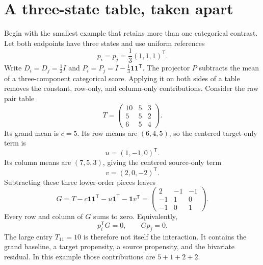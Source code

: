 \section*{A three-state table, taken apart}

Begin with the smallest example that retains more than one categorical contrast.  Let both
endpoints have three states and use uniform references
\begin{equation}
p_i=p_j=\frac13(1,1,1)^{\mathsf T}.
\end{equation}
Write $D_i=D_j=\frac13I$ and
$P_i=P_j=I-\frac13\mathbf1\mathbf1^{\mathsf T}$.  The projector $P$ subtracts the mean of a
three-component categorical score.  Applying it on both sides of a table removes the constant,
row-only, and column-only contributions.
Consider the raw pair table
\begin{equation}
T=
\begin{pmatrix}
10&5&3\\
5&5&2\\
6&5&4
\end{pmatrix}.
\label{eq:book-three-state-raw}
\end{equation}
Its grand mean is $c=5$.  Its row means are $(6,4,5)$, so the centered target-only term is
\begin{equation}
u=(1,-1,0)^{\mathsf T}.
\end{equation}
Its column means are $(7,5,3)$, giving the centered source-only term
\begin{equation}
v=(2,0,-2)^{\mathsf T}.
\end{equation}
Subtracting these three lower-order pieces leaves
\begin{equation}
G=T-c\mathbf1\mathbf1^{\mathsf T}
-u\mathbf1^{\mathsf T}-\mathbf1v^{\mathsf T}
=
\begin{pmatrix}
2&-1&-1\\
-1&1&0\\
-1&0&1
\end{pmatrix}.
\label{eq:book-three-state-gauged}
\end{equation}
Every row and column of $G$ sums to zero.  Equivalently,
\begin{equation}
p_i^{\mathsf T}G=0,
\qquad
Gp_j=0.
\end{equation}
The large entry $T_{11}=10$ is therefore not itself the interaction.  It contains the grand
baseline, a target propensity, a source propensity, and the bivariate residual.  In this example
those contributions are $5+1+2+2$.

